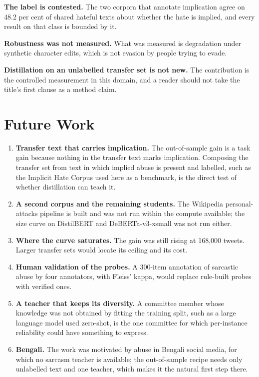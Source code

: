 \textbf{The label is contested.} The two corpora that annotate implication agree on 48.2 per cent of
shared hateful texts about whether the hate is implied, and every result on that class is bounded by
it.

\textbf{Robustness was not measured.} What was measured is degradation under synthetic character
edits, which is not evasion by people trying to evade.

\textbf{Distillation on an unlabelled transfer set is not new.} The contribution is the controlled
measurement in this domain, and a reader should not take the title's first clause as a method claim.

\section{Future Work}
\label{sec:7.2}
\begin{enumerate}
  \item \textbf{Transfer text that carries implication.} The out-of-sample gain is a task gain because
    nothing in the transfer text marks implication. Composing the transfer set from text in which implied
    abuse is present and labelled, such as the Implicit Hate Corpus used here as a benchmark, is the
    direct test of whether distillation can teach it.
  \item \textbf{A second corpus and the remaining students.} The Wikipedia personal-attacks pipeline is
    built and was not run within the compute available; the size curve on DistilBERT and
    DeBERTa-v3-xsmall was not run either.
  \item \textbf{Where the curve saturates.} The gain was still rising at 168,000 tweets. Larger transfer
    sets would locate its ceiling and its cost.
  \item \textbf{Human validation of the probes.} A 300-item annotation of sarcastic abuse by four
    annotators, with Fleiss' kappa, would replace rule-built probes with verified ones.
  \item \textbf{A teacher that keeps its diversity.} A committee member whose knowledge was not obtained
    by fitting the training split, such as a large language model used zero-shot, is the one committee
    for which per-instance reliability could have something to express.
  \item \textbf{Bengali.} The work was motivated by abuse in Bengali social media, for which no sarcasm
    teacher is available; the out-of-sample recipe needs only unlabelled text and one teacher, which makes
    it the natural first step there.
\end{enumerate}
